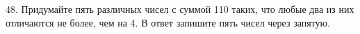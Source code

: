 48. Придумайте пять различных чисел с суммой 110 таких, что любые два из них отличаются не более, чем на 4. В ответ запишите пять чисел через запятую.\\
